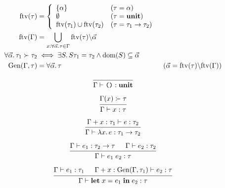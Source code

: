 \documentclass[12pt]{article}
\begin{document}
\pagestyle{empty}

\begin{align*}
    \mathrm{ftv}(\tau) &= \left\{\begin{array}{ll}
        \{\alpha\} &(\tau = \alpha) \\
        \emptyset &(\tau = \mathbf{unit}) \\
        \mathrm{ftv}(\tau_1) \cup \mathrm{ftv}(\tau_2) &(\tau = \tau_1 \to \tau_2)
    \end{array}\right. \\
    \mathrm{ftv}(\Gamma) &= \bigcup_{x:\forall \vec{\alpha}\ldotp \tau \in \Gamma} \mathrm{ftv}(\tau) \backslash \vec{\alpha} \\
    \forall \vec{\alpha}\ldotp \tau_1 \succ \tau_2 &\iff \exists S\ldotp S\tau_1 = \tau_2 \land \mathrm{dom}(S) \subseteq \vec{\alpha} \\
    \mathrm{Gen}(\Gamma, \tau) &= \forall \vec{\alpha}\ldotp \tau &(\vec{\alpha} = \mathrm{ftv}(\tau) \backslash \mathrm{ftv}(\Gamma))
\end{align*}

\[
    \begin{prooftree}
        \infer0{\Gamma \vdash \text{\texttt{()}}: \mathbf{unit}}
    \end{prooftree}
\]

\[
    \begin{prooftree}
        \hypo{\Gamma(x) \succ \tau}
        \infer1{\Gamma \vdash x: \tau}
    \end{prooftree}
\]

\[
    \begin{prooftree}
        \hypo{\Gamma + x: \tau_1 \vdash e: \tau_2}
        \infer1{\Gamma \vdash \lambda x\ldotp e: \tau_1 \to \tau_2}
    \end{prooftree}
\]

\[
    \begin{prooftree}
        \hypo{\Gamma \vdash e_1: \tau_2 \to \tau}
        \hypo{\Gamma \vdash e_2: \tau_2}
        \infer2{\Gamma \vdash e_1\; e_2: \tau}
    \end{prooftree}
\]

\[
    \begin{prooftree}
        \hypo{\Gamma \vdash e_1: \tau_1}
        \hypo{\Gamma + x: \mathrm{Gen}(\Gamma, \tau_1) \vdash e_2: \tau}
        \infer2{\Gamma \vdash \mathbf{let}\;x = e_1\;\mathbf{in}\;e_2: \tau}
    \end{prooftree}
\]
\end{document}
